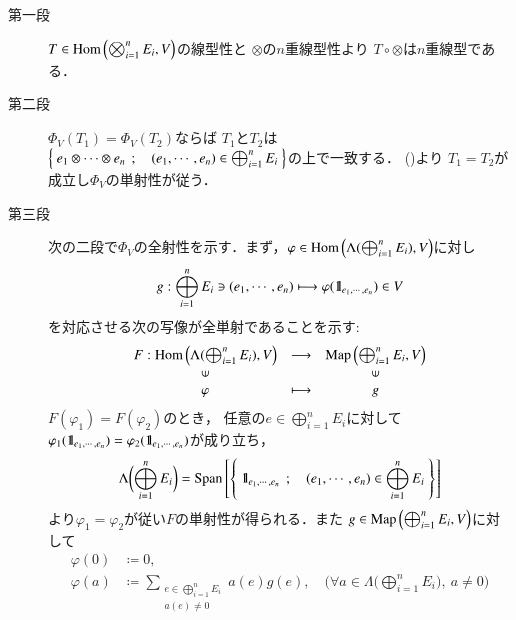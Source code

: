 	\begin{prf}\mbox{}
		\begin{description}
			\item[第一段]
				$T \in \mathrm{Hom} \left(\bigotimes_{i=1}^n E_i,V\right)$の線型性と
				$\otimes$の$n$重線型性より
				$T \circ \otimes$は$n$重線型である．
				
			\item[第二段]
				$\Phi_V(T_1) = \Phi_V(T_2)$ならば
				$T_1$と$T_2$は$\left\{\ e_1 \otimes \cdots \otimes e_n\ \, ; \quad (e_1,\cdots,e_n) \in \bigoplus_{i=1}^n E_i\ \right\}$の上で一致する．
				()より
				$T_1 = T_2$が成立し$\Phi_V$の単射性が従う．
			
			\item[第三段]
				次の二段で$\Phi_V$の全射性を示す．まず，$\varphi \in \mathrm{Hom} \left(\Lambda(\bigoplus_{i=1}^n E_i),V\right)$に対し
				\begin{align}
					g: \bigoplus_{i=1}^n E_i \ni (e_1,\cdots,e_n) \longmapsto \varphi(\mbox{1}\hspace{-0.25em}\mbox{l}_{e_1,\cdots,e_n}) \in V
				\end{align}
				を対応させる次の写像が全単射であることを示す:
				\begin{align}
					\begin{array}{ccc}
						F:\Hom{\Lambda(\bigoplus_{i=1}^n E_i)}{V} & \longrightarrow & \Map{\bigoplus_{i=1}^n E_i}{V} \\
						\rotatebox{90}{$\in$} & & \rotatebox{90}{$\in$} \\
						\varphi & \longmapsto & g
					\end{array}
				\end{align}
				$F(\varphi_1) = F(\varphi_2)$のとき，
				任意の$e \in \bigoplus_{i=1}^n E_i$に対して
				$\varphi_1(\mbox{1}\hspace{-0.25em}\mbox{l}_{e_1,\cdots,e_n}) = \varphi_2(\mbox{1}\hspace{-0.25em}\mbox{l}_{e_1,\cdots,e_n})$が成り立ち，
				\begin{align}
					\Lambda\biggl( \bigoplus_{i=1}^n E_i \biggr) 
					= \mathrm{Span}\left[ \left\{\ \mbox{1}\hspace{-0.25em}\mbox{l}_{e_1,\cdots,e_n}\ \, ; \quad (e_1,\cdots,e_n) \in \bigoplus_{i=1}^n E_i\ \right\} \right]
				\end{align}
				より$\varphi_1 = \varphi_2$が従い$F$の単射性が得られる．また
				$g \in \mathrm{Map} \left(\bigoplus_{i=1}^n E_i,V\right)$に対して
				\begin{align}
					\varphi(0) &\coloneqq 0, \\
					\varphi(a) &\coloneqq \sum_{\substack{e \in \bigoplus_{i=1}^n E_i \\ a(e) \neq 0}} a(e) g(e),
					\quad \biggl(\forall a \in \Lambda\biggl(\bigoplus_{i=1}^n E_i\biggr),\ a \neq 0\biggr)
				\end{align}

\end{description}
\end{prf}
